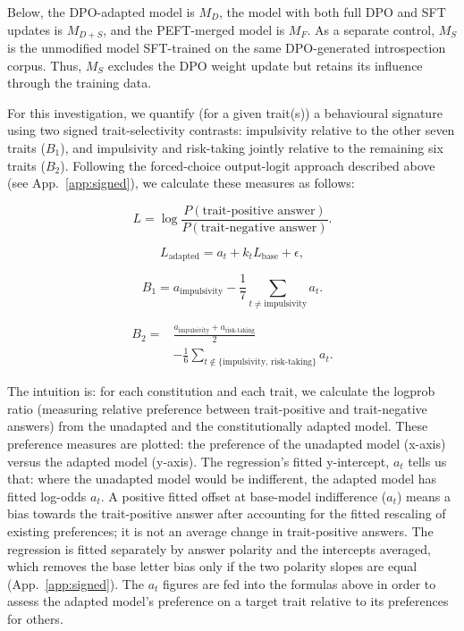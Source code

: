 \documentclass{article}
\begin{document}
Below, the DPO-adapted model is $M_D$, the model with both full DPO and SFT updates is $M_{D+S}$, and the PEFT-merged model is $M_F$. As a separate control, $M_S$ is the unmodified model SFT-trained  on the same DPO-generated introspection corpus. Thus, $M_S$ excludes the DPO weight update but retains its influence through the training data.

For this investigation, we quantify (for a given trait(s)) a behavioural signature using two signed trait-selectivity contrasts: impulsivity relative
to the other seven traits ($B_1$), and impulsivity and risk-taking
jointly relative to the remaining six traits ($B_2$).
Following the forced-choice output-logit approach described above
(see App.~\ref{app:signed}), we calculate these measures as follows:

\[
L
=
\log
\frac{P(\text{trait-positive answer})}
     {P(\text{trait-negative answer})}.
\]

\[
L_{\mathrm{adapted}}
=
a_t + k_t L_{\mathrm{base}} + \epsilon,
\]

\[
B_1
=
a_{\mathrm{impulsivity}}
-
\frac{1}{7}
\sum_{t \neq \mathrm{impulsivity}} a_t.
\]

\[
\begin{aligned}
B_2
={}&
\frac{
a_{\mathrm{impulsivity}}
+
a_{\mathrm{risk\text{-}taking}}
}{2}\\
&-
\frac{1}{6}
\sum_{t \notin
\{\mathrm{impulsivity},\,\mathrm{risk\text{-}taking}\}}
a_t.
\end{aligned}
\]

The intuition is: for each constitution and each trait, we calculate the logprob ratio (measuring relative preference between trait-positive and trait-negative answers) from the unadapted and the constitutionally adapted model. These preference measures are plotted: the preference of the unadapted model (x-axis) versus the adapted model (y-axis). The regression's fitted y-intercept, $a_t$ tells us that: where the unadapted model would be indifferent, the adapted model has fitted log-odds $a_t$. A positive fitted offset at base-model indifference ($a_t$) means a bias towards the trait-positive answer after accounting for the fitted rescaling of existing preferences; it is not an average change in trait-positive answers. The regression is fitted separately by answer polarity and the intercepts averaged, which removes the base letter bias only if the two polarity slopes are equal (App.~\ref{app:signed}). The $a_t$ figures are fed into the formulas above in order to assess the adapted model's preference on a target trait relative to its preferences for others.
\end{document}
